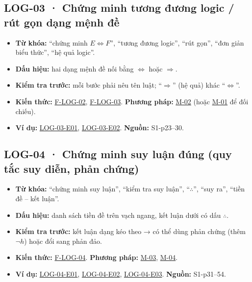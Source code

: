 \documentclass[
  10pt,
  twoside,openany]{book}
\providecommand{\tightlist}{%
  \setlength{\itemsep}{0pt}\setlength{\parskip}{0pt}}
\begin{document}
\hypertarget{LOG-03}{%
\subsection{LOG-03 · Chứng minh tương đương logic / rút gọn dạng mệnh
đề}\label{LOG-03}}

\begin{itemize}
\tightlist
\item
  \textbf{Từ khóa:} ``chứng minh \(E \Leftrightarrow F\)'', ``tương
  đương logic'', ``rút gọn'', ``đơn giản biểu thức'', ``hệ quả logic''.
\item
  \textbf{Dấu hiệu:} hai dạng mệnh đề nối bằng \(\Leftrightarrow\) hoặc
  \(\Rightarrow\).
\item
  \textbf{Kiểm tra trước:} mỗi bước phải nêu tên luật;
  ``\(\Rightarrow\)'' (hệ quả) khác ``\(\Leftrightarrow\)''.
\item
  \textbf{Kiến thức:} \protect\hyperlink{F-LOG-02}{F-LOG-02},
  \protect\hyperlink{F-LOG-03}{F-LOG-03}. \textbf{Phương pháp:}
  \protect\hyperlink{M-02}{M-02} (hoặc \protect\hyperlink{M-01}{M-01} để
  đối chiếu).
\item
  \textbf{Ví dụ:} \protect\hyperlink{LOG-03-E01}{LOG-03-E01},
  \protect\hyperlink{LOG-03-E02}{LOG-03-E02}. \textbf{Nguồn:}
  S1-p23--30.
\end{itemize}

\hypertarget{LOG-04}{%
\subsection{LOG-04 · Chứng minh suy luận đúng (quy tắc suy diễn, phản
chứng)}\label{LOG-04}}

\begin{itemize}
\tightlist
\item
  \textbf{Từ khóa:} ``chứng minh suy luận'', ``kiểm tra suy luận'',
  ``\(\therefore\)'', ``suy ra'', ``tiền đề -- kết luận''.
\item
  \textbf{Dấu hiệu:} danh sách tiền đề trên vạch ngang, kết luận dưới có
  dấu \(\therefore\).
\item
  \textbf{Kiểm tra trước:} kết luận dạng kéo theo → có thể dùng phản
  chứng (thêm \(\neg h\)) hoặc đổi sang phản đảo.
\item
  \textbf{Kiến thức:} \protect\hyperlink{F-LOG-04}{F-LOG-04}.
  \textbf{Phương pháp:} \protect\hyperlink{M-03}{M-03},
  \protect\hyperlink{M-04}{M-04}.
\item
  \textbf{Ví dụ:} \protect\hyperlink{LOG-04-E01}{LOG-04-E01},
  \protect\hyperlink{LOG-04-E02}{LOG-04-E02},
  \protect\hyperlink{LOG-04-E03}{LOG-04-E03}. \textbf{Nguồn:}
  S1-p31--54.
\end{itemize}
\end{document}
